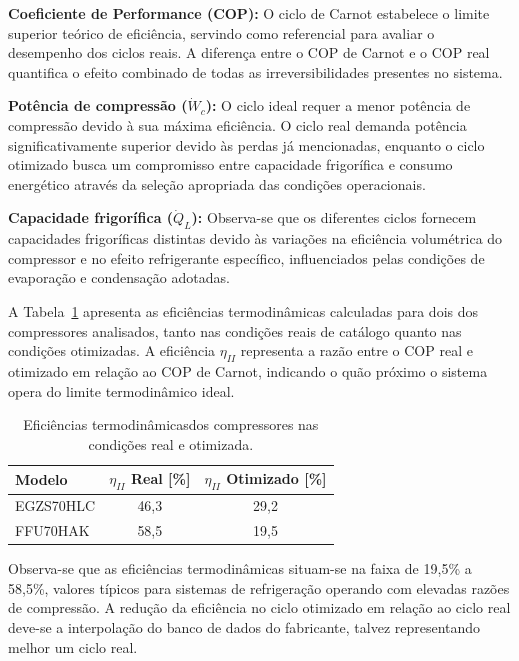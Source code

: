 \textbf{Coeficiente de Performance (COP):} O ciclo de Carnot estabelece o limite superior teórico de eficiência, servindo como referencial para avaliar o desempenho dos ciclos reais. A diferença entre o COP de Carnot e o COP real quantifica o efeito combinado de todas as irreversibilidades presentes no sistema.

\textbf{Potência de compressão ($\dot{W}_c$):} O ciclo ideal requer a menor potência de compressão devido à sua máxima eficiência. O ciclo real demanda potência significativamente superior devido às perdas já mencionadas, enquanto o ciclo otimizado busca um compromisso entre capacidade frigorífica e consumo energético através da seleção apropriada das condições operacionais.

\textbf{Capacidade frigorífica ($\dot{Q}_L$):} Observa-se que os diferentes ciclos fornecem capacidades frigoríficas distintas devido às variações na eficiência volumétrica do compressor e no efeito refrigerante específico, influenciados pelas condições de evaporação e condensação adotadas.

A Tabela~\ref{tab:eficiencias termo} apresenta as eficiências termodinâmicas calculadas para dois dos compressores analisados, tanto nas condições reais de catálogo quanto nas condições otimizadas. A eficiência $\eta_{II}$ representa a razão entre o COP real e otimizado em relação ao COP de Carnot, indicando o quão próximo o sistema opera do limite termodinâmico ideal.

\begin{table}[ht]
\centering
\begin{tabular}{|l|c|c|}
\hline
\textbf{Modelo} & \textbf{$\eta_{II}$ Real [\%]} & \textbf{$\eta_{II}$ Otimizado [\%]} \\ \hline
EGZS70HLC & 46,3 & 29,2 \\ \hline
FFU70HAK & 58,5 & 19,5 \\ \hline
\end{tabular}
\caption{Eficiências termodinâmicasdos compressores nas condições real e otimizada.}
\label{tab:eficiencias termo}
\end{table}

Observa-se que as eficiências termodinâmicas situam-se na faixa de 19,5\% a 58,5\%, valores típicos para sistemas de refrigeração operando com elevadas razões de compressão. A redução da eficiência no ciclo otimizado em relação ao ciclo real deve-se a interpolação do banco de dados do fabricante, talvez representando melhor um ciclo real.
